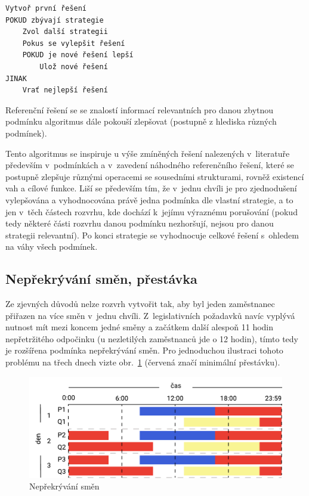 \documentclass[a4paper,11pt,openany,twoside]{book}
\begin{document}
\begin{lstlisting}[caption={Pseudokód rozvrhovacího algoritmu}, label={lst:scheduling}]
Vytvoř první řešení
POKUD zbývají strategie
	Zvol další strategii
	Pokus se vylepšit řešení
	POKUD je nové řešení lepší
		Ulož nové řešení
JINAK
	Vrať nejlepší řešení
\end{lstlisting}

Referenční řešení se se znalostí informací relevantních pro danou zbytnou podmínku algoritmus dále pokouší zlepšovat (postupně z hlediska různých podmínek).

Tento algoritmus se inspiruje u výše zmíněných řešení nalezených v~literatuře především v~podmínkách a v~zavedení náhodného referenčního řešení, které se postupně zlepšuje různými operacemi se sousedními strukturami, rovněž existencí vah a cílové funkce. Liší se především tím, že v~jednu chvíli je pro zjednodušení vylepšována a vyhodnocována právě jedna podmínka dle vlastní strategie, a to jen v~těch částech rozvrhu, kde dochází k~jejímu výraznému porušování (pokud tedy některé části rozvrhu danou podmínku nezhoršují, nejsou pro danou strategii relevantní). Po konci strategie se vyhodnocuje celkové řešení s~ohledem na váhy všech podmínek.

\subsection{Nepřekrývání směn, přestávka}
Ze zjevných důvodů nelze rozvrh vytvořit tak, aby byl jeden zaměstnanec přiřazen na více směn v~jednu chvíli. Z~legislativních požadavků navíc vyplývá nutnost mít mezi koncem jedné směny a začátkem další alespoň 11 hodin nepřetržitého odpočinku (u nezletilých zaměstnanců jde o 12 hodin), tímto tedy je rozšířena podmínka nepřekrývání směn. Pro jednoduchou ilustraci tohoto problému na třech dnech vizte obr.~\ref{fig:shiftprecedencefull} (červená značí minimální přestávku).

\begin{figure}[h!]
	\centering
	\includegraphics[scale=0.7]{img/shift-overlap.pdf}
	\caption{Nepřekrývání směn}
	\label{fig:shiftprecedencefull}
\end{figure}
\end{document}
